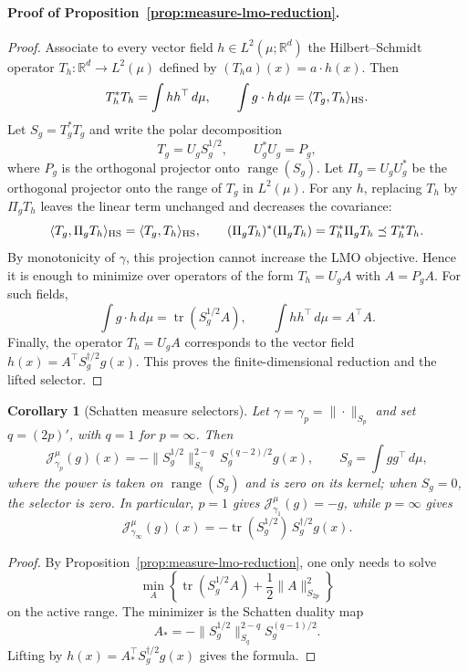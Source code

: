 \documentclass{article}
\newtheorem{corollary}[theorem]{Corollary}
\newcommand{\R}{\mathbb{R}}
\newcommand{\MJ}{\mathcal{J}}
\newcommand{\tr}{\operatorname{tr}}
\begin{document}
\paragraph{Proof of Proposition~\ref{prop:measure-lmo-reduction}.}
\begin{proof}
Associate to every vector field $h\in L^2(\mu;\R^d)$ the Hilbert--Schmidt
operator $T_h:\R^d\to L^2(\mu)$ defined by $(T_ha)(x)=a\cdot h(x)$. Then
$$
T_h^*T_h=\int hh^\top\,d\mu,
\qquad
\int g\cdot h\,d\mu=\langle T_g,T_h\rangle_{\rm HS}.
$$
Let $S_g=T_g^*T_g$ and write the polar decomposition
$$
T_g=U_gS_g^{1/2},
\qquad
U_g^*U_g=P_g,
$$
where $P_g$ is the orthogonal projector onto $\operatorname{range}(S_g)$.
Let $\Pi_g=U_gU_g^*$ be the orthogonal projector onto the range of $T_g$ in
$L^2(\mu)$. For any $h$, replacing $T_h$ by $\Pi_gT_h$ leaves the linear term
unchanged and decreases the covariance:
$$
\langle T_g,\Pi_gT_h\rangle_{\rm HS}
=
\langle T_g,T_h\rangle_{\rm HS},
\qquad
(\Pi_gT_h)^*(\Pi_gT_h)=T_h^*\Pi_gT_h\preceq T_h^*T_h.
$$
By monotonicity of $\gamma$, this projection cannot increase the LMO
objective. Hence it is enough to minimize over operators of the form
$T_h=U_gA$ with $A=P_gA$. For such fields,
$$
\int g\cdot h\,d\mu=\tr(S_g^{1/2}A),
\qquad
\int hh^\top\,d\mu=A^\top A.
$$
Finally, the operator $T_h=U_gA$ corresponds to the vector field
$h(x)=A^\top S_g^{\dagger/2}g(x)$. This proves the finite-dimensional
reduction and the lifted selector.
\end{proof}

\begin{corollary}[Schatten measure selectors]
\label{cor:schatten-measure-selectors}
Let $\gamma=\gamma_p=\|\cdot\|_{S_p}$ and set
$q=(2p)'$, with $q=1$ for $p=\infty$. Then
$$
\MJ_{\gamma_p}^\mu(g)(x)
=
-\|S_g^{1/2}\|_{S_q}^{2-q}\,S_g^{(q-2)/2}g(x),
\qquad
S_g=\int gg^\top\,d\mu,
$$
where the power is taken on $\operatorname{range}(S_g)$ and is zero on its
kernel; when $S_g=0$, the selector is zero. In particular, $p=1$ gives
$\MJ_{\gamma_1}^\mu(g)=-g$, while
$p=\infty$ gives
$$
\MJ_{\gamma_\infty}^\mu(g)(x)
=
-\tr(S_g^{1/2})\,S_g^{\dagger/2}g(x).
$$
\end{corollary}

\begin{proof}
By Proposition~\ref{prop:measure-lmo-reduction}, one only needs to solve
$$
\min_A\left\{\tr(S_g^{1/2}A)+\frac12\|A\|_{S_{2p}}^2\right\}
$$
on the active range. The minimizer is the Schatten duality map
$$
A_*=-\|S_g^{1/2}\|_{S_q}^{2-q}S_g^{(q-1)/2}.
$$
Lifting by $h(x)=A_*^\top S_g^{\dagger/2}g(x)$ gives the formula.
\end{proof}
\end{document}

